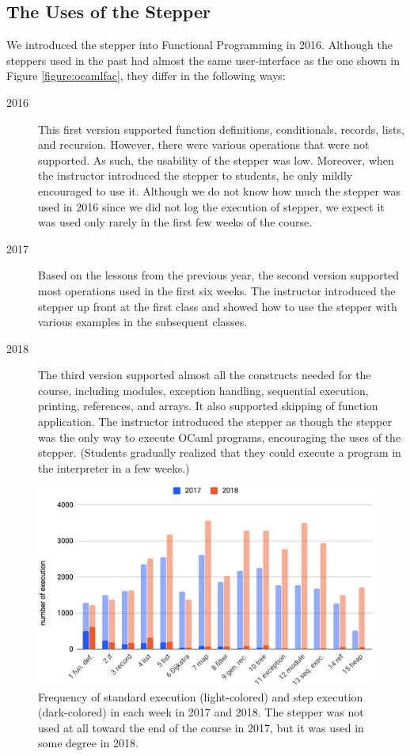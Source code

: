 \subsection{The Uses of the Stepper}
We introduced the stepper into Functional Programming in 2016.
Although the steppers used in the past had almost the same user-interface as the one shown in Figure \ref{figure:ocamlfac}, they differ in the following ways:
\begin{description}
\item[2016] This first version supported function definitions,
conditionals, records, lists, and recursion.  However, there were
various operations that were not supported.
As such, the usability of the stepper was low.
Moreover, when the instructor introduced the stepper to students, he
only mildly encouraged to use it.
Although we do not know how much the stepper was used in 2016 since we
did not log the execution of stepper, we expect it was used
only rarely in the first few weeks of the course.
\item[2017] Based on the lessons from the previous year, the second
version supported most operations used in the first six weeks.
The instructor introduced the stepper up front at the first class and
showed how to use the stepper with various examples in the subsequent
classes.
\item[2018] The third version supported almost all the constructs
needed for the course, including modules, exception handling,
sequential execution, printing, references, and arrays.
It also supported skipping of function application.
The instructor introduced the stepper as though the stepper was the
only way to execute OCaml programs, encouraging the uses of the
stepper.
(Students gradually realized that they could execute a program in the
interpreter in a few weeks.)
\end{description}

\begin{figure}
  \begin{center}
    \includegraphics[width=15cm]{5/table1a.eps}
    \caption{Frequency of standard execution (light-colored) and step execution (dark-colored) in each week in 2017 and 2018. The stepper was not used at all toward the end of the course in 2017, but it was used in some degree in 2018.}
    \label{figure:allExecution}
  \end{center}
\end{figure}


